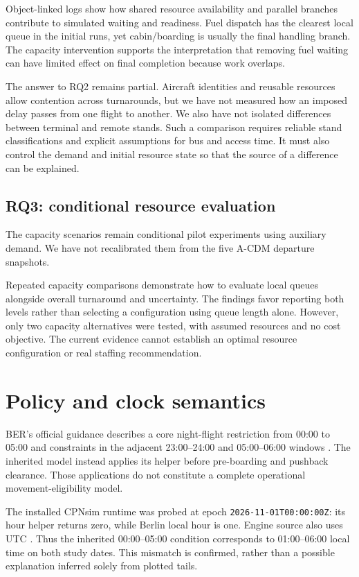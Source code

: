 Object-linked logs show how shared resource availability and parallel branches contribute to simulated waiting and readiness. Fuel dispatch has the clearest local queue in the initial runs, yet cabin/boarding is usually the final handling branch. The capacity intervention supports the interpretation that removing fuel waiting can have limited effect on final completion because work overlaps.

The answer to RQ2 remains partial. Aircraft identities and reusable resources allow contention across turnarounds, but we have not measured how an imposed delay passes from one flight to another. We also have not isolated differences between terminal and remote stands. Such a comparison requires reliable stand classifications and explicit assumptions for bus and access time. It must also control the demand and initial resource state so that the source of a difference can be explained.

\subsection{RQ3: conditional resource evaluation}
The capacity scenarios remain conditional pilot experiments using auxiliary demand. We have not recalibrated them from the five A-CDM departure snapshots.

Repeated capacity comparisons demonstrate how to evaluate local queues alongside overall turnaround and uncertainty. The findings favor reporting both levels rather than selecting a configuration using queue length alone. However, only two capacity alternatives were tested, with assumed resources and no cost objective. The current evidence cannot establish an optimal resource configuration or real staffing recommendation.

\section{Policy and clock semantics}
BER's official guidance describes a core night-flight restriction from 00:00 to 05:00 and constraints in the adjacent 23:00--24:00 and 05:00--06:00 windows \cite{ber_night}. The inherited model instead applies its helper before pre-boarding and pushback clearance. Those applications do not constitute a complete operational movement-eligibility model.

The installed CPNsim runtime was probed at epoch \texttt{2026-11-01T00:00:00Z}: its hour helper returns zero, while Berlin local hour is one. Engine source also uses UTC \cite{cpnsim}. Thus the inherited 00:00--05:00 condition corresponds to 01:00--06:00 local time on both study dates. This mismatch is confirmed, rather than a possible explanation inferred solely from plotted tails.

